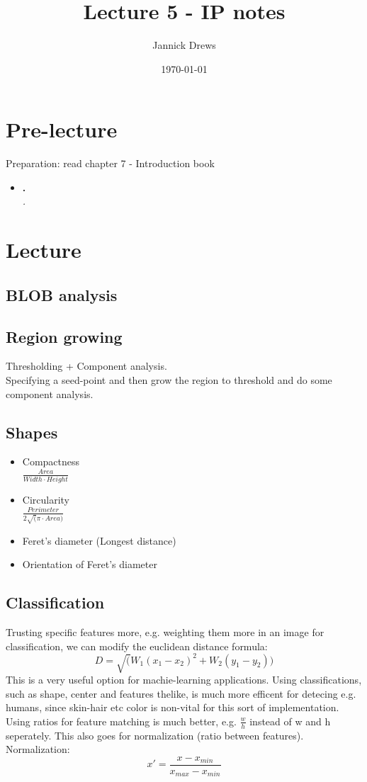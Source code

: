 \documentclass{article}
\title{Lecture 5 - IP notes}
\author{Jannick Drews}
\date{\today}
\begin{document}
\maketitle
\newpage

\section{Pre-lecture}
Preparation: read chapter 7 - Introduction book\\
\begin{itemize}
  \item \textbf{.}\\
    \textit{.}
\end{itemize}

\section{Lecture}
\subsection{BLOB analysis}

\subsection{Region growing}
Thresholding + Component analysis.\\
Specifying a seed-point and then grow the region to threshold and do some component analysis. 

\subsection{Shapes}
\begin{itemize}
  \item Compactness\\
    $\frac{Area}{Width \cdot Height}$
  \item Circularity\\
    $\frac{Perimeter}{2\sqrt(\pi \cdot Area)}$
  \item Feret's diameter (Longest distance)\\
  \item Orientation of Feret's diameter\\
\end{itemize}

\subsection{Classification}
Trusting specific features more, e.g. weighting them more in an image for classification, we can modify the euclidean distance formula:
$$ D = \sqrt(W_1(x_1 - x_2)^2 + W_2(y_1 - y_2)) $$
This is a very useful option for machie-learning applications. Using classifications, such as shape, center and features thelike, is much more efficent for detecing e.g. humans, since skin-hair etc color is non-vital for this sort of implementation.\\
Using ratios for feature matching is much better, e.g. $\frac{w}{h}$ instead of w and h seperately. This also goes for normalization (ratio between features).
Normalization: $$x' = \frac{x-x_{min}}{x_{max}-x_{min}}$$
\end{document}
